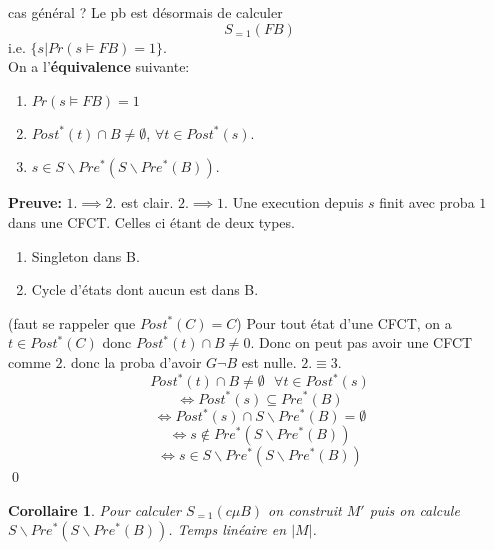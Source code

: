 \documentclass[12pt]{article}
\theoremstyle{plain}
\newtheorem{cor}[subsubsection]{Corollaire}
\theoremstyle{definition}
\theoremstyle{remark}
\begin{document}
cas général ? Le pb est désormais de calculer 
\[S_{=1}(FB)\] i.e. $\{s|Pr(s\vDash FB)=1\}$.\\
\newpage 
\noindent On a l'\textbf{équivalence} suivante:
\begin{enumerate}
    \item $Pr(s\vDash FB)=1$
    \item $Post^*(t)\cap B\ne \emptyset$, $\forall t\in Post^*(s)$.
    \item $s\in S\backslash Pre^*(S\backslash Pre^*(B))$.
\end{enumerate}
\noindent\textbf{Preuve:} $1.\implies 2.$ est clair. 
$2.\implies 1.$ Une execution depuis $s$ finit avec proba 
$1$ dans une CFCT. Celles ci étant de deux types. 
\begin{enumerate}
    \item Singleton dans B.
    \item Cycle d'états dont aucun est dans B.
\end{enumerate}
(faut se rappeler que $Post^*(C)=C$) Pour tout état d'une
CFCT, on a $t\in Post^*(C)$ donc $Post^*(t)\cap B\ne 0$.
Donc on peut pas avoir une CFCT comme $2.$ donc la proba 
d'avoir $G\neg B$ est nulle. $2. \equiv 3.$ 
\[Post^*(t)\cap B\ne \emptyset~~~\forall t\in Post^*(s)\]
\[\Leftrightarrow Post^*(s)\subseteq Pre^*(B)\]
\[\Leftrightarrow Post^*(s)\cap S\backslash Pre^*(B)=\emptyset\]
\[\Leftrightarrow s\notin Pre^*(S\backslash Pre^*(B))\]
\[\Leftrightarrow s\in S\backslash Pre^*(S\backslash Pre^*(B))\]\qed
\begin{cor}
    Pour calculer $S_{=1}(c\mu B)$ on construit $M'$ 
    puis on calcule $S\backslash Pre^*(S\backslash Pre^*(B))$.
    Temps linéaire en $|M|$.
\end{cor}





    
\end{document}
